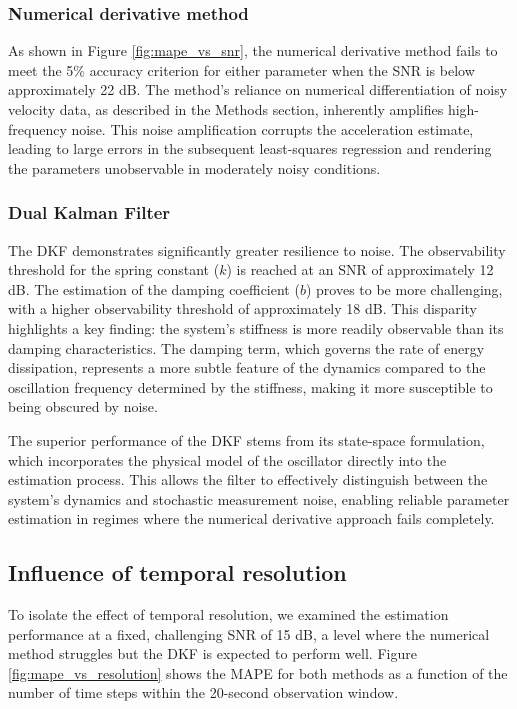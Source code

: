\documentclass[]{article}
\begin{document}
\subsubsection{Numerical derivative method}
As shown in Figure \ref{fig:mape_vs_snr}, the numerical derivative method fails to meet the 5\% accuracy criterion for either parameter when the SNR is below approximately 22 dB. The method's reliance on numerical differentiation of noisy velocity data, as described in the Methods section, inherently amplifies high-frequency noise. This noise amplification corrupts the acceleration estimate, leading to large errors in the subsequent least-squares regression and rendering the parameters unobservable in moderately noisy conditions.

\subsubsection{Dual Kalman Filter}
The DKF demonstrates significantly greater resilience to noise. The observability threshold for the spring constant ($k$) is reached at an SNR of approximately 12 dB. The estimation of the damping coefficient ($b$) proves to be more challenging, with a higher observability threshold of approximately 18 dB. This disparity highlights a key finding: the system's stiffness is more readily observable than its damping characteristics. The damping term, which governs the rate of energy dissipation, represents a more subtle feature of the dynamics compared to the oscillation frequency determined by the stiffness, making it more susceptible to being obscured by noise.

The superior performance of the DKF stems from its state-space formulation, which incorporates the physical model of the oscillator directly into the estimation process. This allows the filter to effectively distinguish between the system's dynamics and stochastic measurement noise, enabling reliable parameter estimation in regimes where the numerical derivative approach fails completely.

\subsection{Influence of temporal resolution}
To isolate the effect of temporal resolution, we examined the estimation performance at a fixed, challenging SNR of 15 dB, a level where the numerical method struggles but the DKF is expected to perform well. Figure \ref{fig:mape_vs_resolution} shows the MAPE for both methods as a function of the number of time steps within the 20-second observation window.
\end{document}
